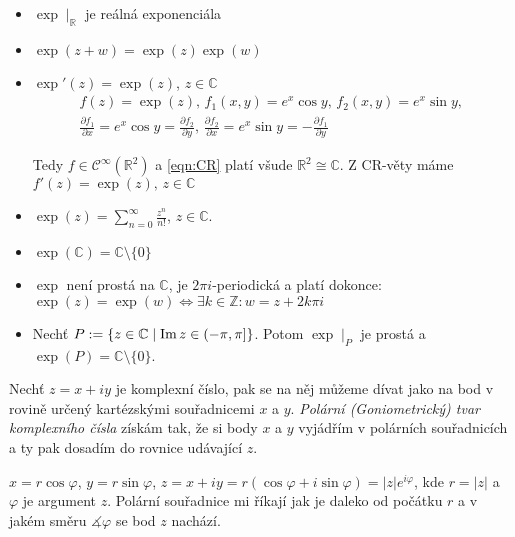 \begin{properties}
\mbox{}
\vspace{-2em}
\begin{itemize}    
    \item $\exp \mid_\mathbb{R}$ je reálná exponenciála 
    \item $\exp(z+w)=\exp(z)\exp(w)$
    \item $\exp'(z)=\exp(z)$, $ z \in\mathbb{C}$
     \begin{multline*}
         f(z)=\exp(z)\text{, }f_1(x,y)=e^x \cos y\text{, } f_2(x,y)=e^x\sin y\text{, }\\
         \frac{\partial f_1}{\partial x} = e^x\cos y = \frac{\partial f_2}{\partial y}\text{, }
     \frac{\partial f_2}{\partial x} = e^x \sin y= - \frac{\partial f_1}{\partial y}
     \end{multline*}
     
    Tedy $f\in\mathcal{C}^{\infty}(\mathbb{R}^2)$ %
    a \cref{eqn:CR} platí všude $\mathbb{R}^2\cong\mathbb{C}$. Z CR-věty máme $f'(z)=\exp(z)\text{, } z\in\mathbb{C}$
    \item $\exp(z)=\sum_{n=0}^{\infty}\frac{z^n}{n!}$, $z\in\mathbb{C}\text{.}$
    \item $\exp(\mathbb{C})=\mathbb{C}\setminus\{0\}$ 
    \item $\exp$ není prostá na $\mathbb{C}$, je $2\pi i$-periodická a platí dokonce:
    \newline
    $\exp(z) =\exp(w) \iff\exists k \in\mathbb{Z}\colon w=z+2k\pi i$
     \item Nechť $P:=\{z\in\mathbb{C}\mid \operatorname{Im} z \in \left (-\pi,\pi\right ]\}$.
     Potom $\exp\mid_P$ je prostá a $\exp(P)=\mathbb{C}\setminus\{0\}$.
    \newline
  \end{itemize}  
  \end{properties}
  \begin{definition}
    Nechť $z=x+iy$ je komplexní číslo, pak se na něj můžeme dívat jako na bod v rovině určený kartézskými souřadnicemi $x$ a $y$. \emph{Polární (Goniometrický) tvar komplexního čísla} získám tak, že si body $x$ a $y$ vyjádřím v polárních souřadnicích a ty pak dosadím do rovnice udávající $z$.
    
    
       $x=r\cos \varphi$, 
       $y=r\sin \varphi$, 
       $z=x+iy=r(\cos \varphi + i \sin \varphi)=\lvert z \rvert e^{i\varphi} $, kde $r=\lvert z \rvert$ a $\varphi$ je argument $z$.
       Polární souřadnice mi říkají jak je daleko od počátku $r$ a v jakém směru  $\measuredangle \varphi$ se bod $z$ nachází.
 \end{definition}
     
